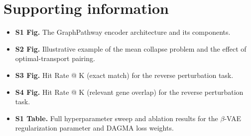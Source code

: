 \section*{Supporting information}
\begin{itemize}
\item \textbf{S1 Fig.} The GraphPathway encoder architecture and its components.
\item \textbf{S2 Fig.} Illustrative example of the mean collapse problem and the effect of optimal-transport pairing.
\item \textbf{S3 Fig.} Hit Rate @ K (exact match) for the reverse perturbation task.
\item \textbf{S4 Fig.} Hit Rate @ K (relevant gene overlap) for the reverse perturbation task.
\item \textbf{S1 Table.} Full hyperparameter sweep and ablation results for the $\beta$-VAE regularization parameter and DAGMA loss weights.
\end{itemize}

